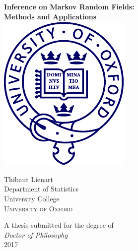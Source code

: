\begin{titlepage}
\begin{center}

\vspace*{1.2cm}

{\Huge{\bfseries Inference on Markov Random Fields:\\[.1cm] Methods and Applications}\\}
\vfill 
\vspace*{-.3cm}
\includegraphics[scale=.8]{figures/oxlogo}
\vspace*{-.7cm}
\vfill

{\Large Thibaut Lienart}\\[.5cm]

{\large 
   	{Department of Statistics}}\\[0.3cm]
{\large 
   	{University College}}\\[0.5cm]
{\Large
	{\textsc{University of Oxford}}}
	
\vspace*{-.4cm}
\vfill

{\large A thesis submitted for the degree of}\\[.3cm]

{\large \emph{Doctor of Philosophy}}\\[.3cm]

{\large {} 2017}
\vfill
\end{center}
\end{titlepage}